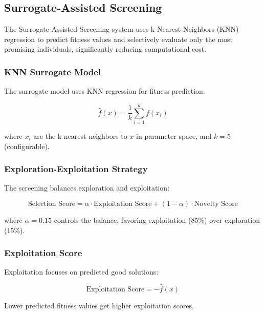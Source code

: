 \documentclass[12pt,a4paper]{article}
\begin{document}
\subsection{Surrogate-Assisted Screening}

The Surrogate-Assisted Screening system uses k-Nearest Neighbors (KNN) regression to predict fitness values and selectively evaluate only the most promising individuals, significantly reducing computational cost.

\subsubsection{KNN Surrogate Model}

The surrogate model uses KNN regression for fitness prediction:

\begin{equation}\label{Eq.knn_prediction}
\hat{f}(x) = \frac{1}{k} \sum_{i=1}^{k} f(x_i)
\end{equation}

where $x_i$ are the k nearest neighbors to $x$ in parameter space, and $k=5$ (configurable).

\subsubsection{Exploration-Exploitation Strategy}

The screening balances exploration and exploitation:

\begin{equation}\label{Eq.surrogate_selection}
\text{Selection Score} = \alpha \cdot \text{Exploitation Score} + (1 - \alpha) \cdot \text{Novelty Score}
\end{equation}

where $\alpha = 0.15$ controls the balance, favoring exploitation (85\%) over exploration (15\%).

\subsubsection{Exploitation Score}

Exploitation focuses on predicted good solutions:

\begin{equation}\label{Eq.exploitation_score}
\text{Exploitation Score} = -\hat{f}(x)
\end{equation}

Lower predicted fitness values get higher exploitation scores.
\end{document}
